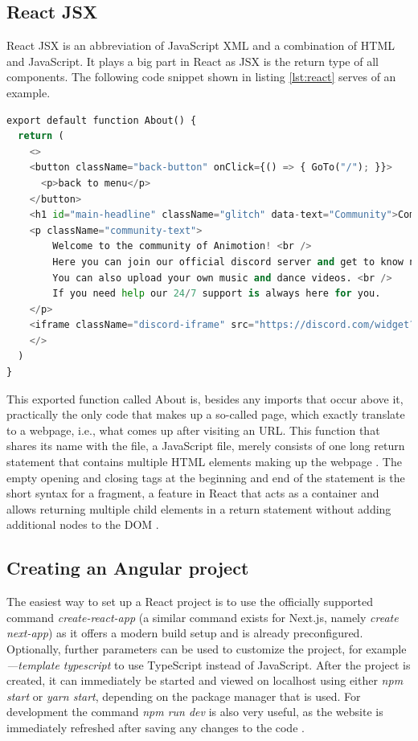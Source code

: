 \subsection{React JSX}
React JSX is an abbreviation of JavaScript XML and a combination
of HTML and JavaScript. It plays a big part in React as JSX is the return type of all components. The following 
code snippet shown in listing \ref{lst:react} serves of an example.

\begin{lstlisting}[language=Python,caption=Example of a react component,label=lst:react]
  export default function About() {
  return (
    <>
    <button className="back-button" onClick={() => { GoTo("/"); }}>
      <p>back to menu</p>
    </button>
    <h1 id="main-headline" className="glitch" data-text="Community">Community</h1>
    <p className="community-text">
        Welcome to the community of Animotion! <br />
        Here you can join our official discord server and get to know new people. <br />
        You can also upload your own music and dance videos. <br />
        If you need help our 24/7 support is always here for you.
    </p>
    <iframe className="discord-iframe" src="https://discord.com/widget?id=1035647726634934382&theme=dark" allowtransparency="true" frameBorder="0" sandbox="allow-popups allow-popups-to-escape-sandbox allow-same-origin allow-scripts"></iframe>
    </>
  )
}
\end{lstlisting}

This exported function called About is, besides any imports that occur above it, practically the only code that makes 
up a so-called page, which exactly translate to a webpage, i.e., what comes up after visiting an URL. This function 
that shares its name with the file, a JavaScript file, merely consists of one long return statement that 
contains multiple HTML elements making up the webpage \cite{ReactJSX}.
The empty opening and closing tags at the beginning and end of the statement is the short syntax for a fragment, a 
feature in React that acts as a container and allows returning multiple child elements in a return statement 
without adding additional nodes to the DOM \cite{ReactFragments}.

\subsection{Creating an Angular project}
The easiest way to set up a React project is to use the officially supported command \emph{create-react-app}
(a similar command exists for Next.js, namely \emph{create next-app}) as it offers a modern build setup and is already preconfigured. 
Optionally, further parameters can be used to customize the project, for example \emph{—template typescript} to use TypeScript 
instead of JavaScript. After the project is created, it can immediately be started and viewed on localhost using either 
\emph{npm start} or \emph{yarn start}, depending on the package manager that is used. For development the command \emph{npm run dev} is 
also very useful, as the website is immediately refreshed after saving any changes to the code \cite{create-react}.

